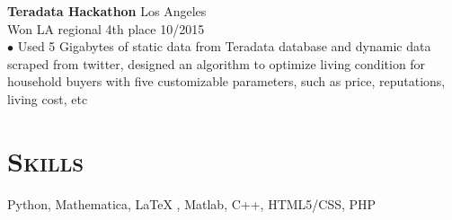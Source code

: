 \documentclass[line, margin]{res}
\begin{document}
\begin{resume}
\textbf{Teradata Hackathon} \hfill  Los Angeles\\
Won LA regional 4th place \hfill 10/2015\\
$\bullet$ Used 5 Gigabytes of static data from Teradata database and dynamic data scraped from twitter, designed an algorithm to optimize living condition for household buyers with five customizable parameters, such as price, reputations, living cost, etc

\section{\textsc{Skills}}
Python, Mathematica, \LaTeX{} , Matlab, C++, HTML5/CSS, PHP


\end{resume}
\end{document}
